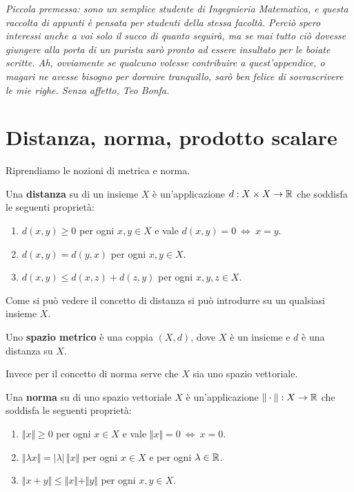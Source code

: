 
\nointerlineskip
\begin{flushright}
\textit{Piccola premessa: sono un semplice studente di Ingegnieria Matematica, e questa raccolta di appunti è pensata per studenti della stessa facoltà. Perciò spero interessi anche a voi solo il succo di quanto seguirà, ma se mai tutto ciò dovesse giungere alla porta di un purista sarò pronto ad essere insultato per le boiate scritte. Ah, ovviamente se qualcuno volesse contribuire a quest'appendice, o magari ne avesse bisogno per dormire tranquillo, sarò ben felice di sovrascrivere le mie righe. Senza affetto, Teo Bonfa.}
\end{flushright}

\section{Distanza, norma, prodotto scalare}

Riprendiamo le nozioni di metrica e norma.

\begin{defn}
Una \textbf{distanza} su di un insieme $X$ è un'applicazione $d:X\times X\to\mathbb{R}$ che soddisfa le seguenti proprietà:
\begin{enumerate}
    \item $d(x,y)\geq 0$ per ogni $x,y\in X$ e vale $d(x,y)=0\ \Leftrightarrow\ x=y$.
    \item $d(x,y)=d(y,x)$ per ogni $x,y\in X$.
    \item $d(x,y)\leq d(x,z)+d(z,y)$ per ogni $x,y,z\in X$.
\end{enumerate}
\end{defn}
Come si può vedere il concetto di distanza si può introdurre su un qualsiasi insieme $X$.

\begin{defn}
Uno \textbf{spazio metrico} è una coppia $\left(X,d\right)$, dove $X$ è un insieme e $d$ è una distanza su $X$.
\end{defn}

Invece per il concetto di norma serve che $X$ sia uno spazio vettoriale.

\begin{defn}
Una \textbf{norma} su di uno spazio vettoriale $X$ è un'applicazione $\Vert\cdot\Vert:X\to\mathbb{R}$ che soddisfa le seguenti proprietà:
\begin{enumerate}
    \item $\Vert x \Vert\geq 0$ per ogni $x\in X$ e vale $\Vert x \Vert=0\ \Leftrightarrow\ x=0$.
    \item $\Vert \lambda x \Vert=|\lambda|\,\Vert x \Vert$ per ogni $x\in X$ e per ogni $\lambda\in\mathbb{R}$.
    \item $\Vert x+y \Vert\leq \Vert x \Vert+\Vert y \Vert$ per ogni $x,y\in X$.
\end{enumerate}
\end{defn}

